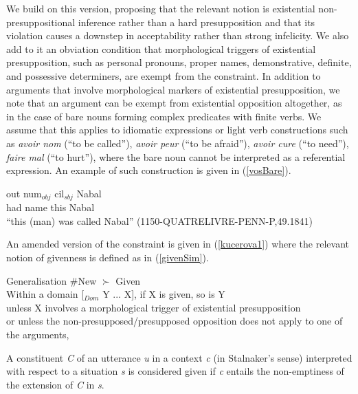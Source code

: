 \documentclass[output=paper,modfonts,nonflat]{langsci/langscibook}
\begin{document}
We build on this version, proposing that the relevant notion is existential non-presuppositional inference rather than a hard presupposition and that its violation causes a downstep in acceptability rather than strong infelicity. We also add to it an obviation condition that morphological triggers of existential presupposition, such as personal pronouns, proper names, demonstrative, definite, and possessive determiners, are exempt from the constraint. In addition to arguments that involve morphological markers of existential presupposition, we note that an argument can be exempt from existential opposition altogether, as in the case of bare nouns forming complex predicates with finite verbs. We assume that this applies to idiomatic expressions or light verb constructions such as {\it avoir nom} (``to be called''), {\it avoir peur} (``to be afraid''), {\it avoir cure} (``to need''), {\it faire mal} (``to hurt''), where the bare noun cannot be interpreted as a referential expression. An example of such construction is given in (\ref{vosBare}). 

\ea
\gll out num$_{obj}$ cil$_{sbj}$ Nabal\\
had name this Nabal\\
\glt ``this (man) was called Nabal'' \hfill \scriptsize{(1150-QUATRELIVRE-PENN-P,49.1841)} \label{vosBare}
\z 

An amended version of the constraint is given in (\ref{kucerova1}) where the relevant notion of givenness is defined as in (\ref{givenSim}).

\ea \label{kucerova1}
Generalisation \#New $\succ$ Given\\
Within a domain [$_{Dom}$ Y ... X], if X is given, so is Y\\
unless X involves a morphological trigger of existential presupposition\\
or unless the non-presupposed/presupposed opposition does not apply to one of the arguments,\\
\z

\ea \label{givenSim}
A constituent {\it C} of an utterance {\it u} in a context {\it c} (in Stalnaker's sense) interpreted with respect to a situation {\it s} is considered given if {\it c} entails the non-emptiness of the extension of {\it C} in {\it s}.
\z
\end{document}
